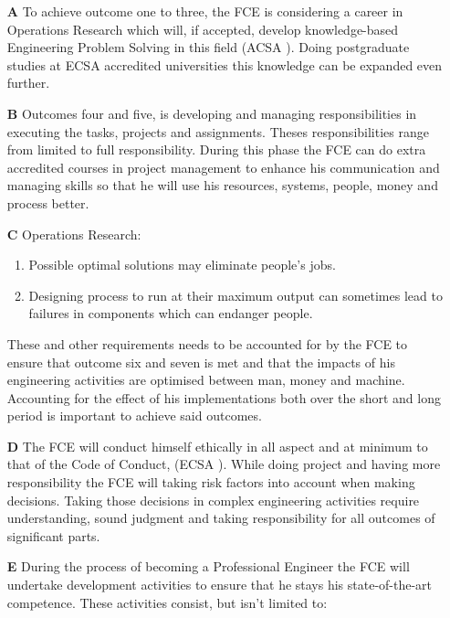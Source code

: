 \documentclass[11pt,a4paper]{article}
\begin{document}
	\begin{itemize}
	
	\item[\textbf{A}]
		To achieve outcome one to three, the FCE is considering a career in Operations Research which will, if accepted, develop knowledge-based Engineering Problem Solving in this field (ACSA \citeyear{ECSA_2012a}). 
		Doing postgraduate studies at ECSA accredited universities this knowledge can be expanded even further.
	
	\item[\textbf{B}] 
		Outcomes four and five, is developing and managing responsibilities in executing the tasks, projects and assignments.
	Theses responsibilities range from limited to full responsibility. During this phase the FCE can do extra accredited courses in project management to enhance his communication and managing skills so that he will use his resources, systems, people, money and process better.
	
	\item[\textbf{C}] 
		Operations Research:
	
		\begin{enumerate}
		\item	Possible optimal solutions may eliminate people's jobs.
	
		\item	Designing process to run at their maximum output can sometimes lead to failures in components which can endanger people.
		\end{enumerate}
	
	These and other requirements needs to be accounted for by the FCE to ensure that outcome six and seven is met and that the impacts of his engineering activities are optimised between man, money and machine.
	Accounting for the effect of his implementations both over the short and long period is important to achieve said outcomes.
	
	\item[\textbf{D}]
		The FCE will conduct himself ethically in all aspect and at minimum to that of the Code of Conduct, (ECSA \citeyear{ECSA_2013b}).
		While doing project and having more responsibility the FCE will taking risk factors into account when making decisions.
		Taking those decisions in complex engineering activities require understanding, sound judgment and taking responsibility for all outcomes of significant parts.
	
	\item[\textbf{E}] 
		During the process of becoming a Professional Engineer the FCE will undertake development activities to ensure that he stays his state-of-the-art competence. These activities consist, but isn't limited to:
		

\end{itemize}
\end{document}
